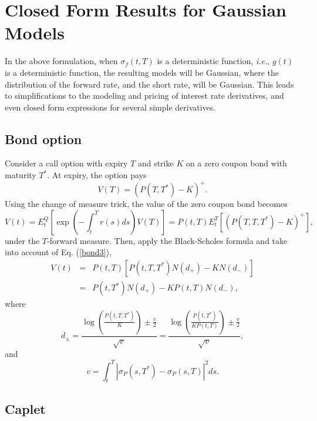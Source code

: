 \documentclass[12pt]{article}
\begin{document}
\section{Closed Form Results for Gaussian Models}

  In the above formulation, when $\sigma_f(t,T)$ is a deterministic function, {\it i.e.}, $g(t)$ is a deterministic function,
  the resulting models will be Gaussian, where the distribution of the forward rate, and the short rate, will be Gaussian.
  This leads to simplifications to the modeling and pricing of interest rate derivatives, and even closed form expressions
  for several simple derivatives.
    
  \subsection{Bond option}
  
    Consider a call option with expiry $T$ and strike $K$ on a zero coupon bond with maturity $T^*$. At expiry, the
    option pays
    \begin{equation}
      V(T)=\left(P(T,T^*)-K\right)^+.
    \end{equation}
    Using the change of measure trick, the value of the zero coupon bond becomes
    \begin{equation}
      V(t)=E_t^Q\left[\exp\left(-\int_t^Tr(s)ds\right)V(T)\right]=P(t,T)E_t^T\left[\left(P(T,T,T^*)-K\right)^+\right],
    \end{equation}
    under the $T$-forward measure. Then, apply the Black-Scholes formula and take into account of Eq. (\ref{bond3}),
    \begin{eqnarray}
      V(t) &=& P(t,T)\left[P(t,T,T^*)N(d_+)-KN(d_-)\right] \nonumber\\
           &=& P(t,T^*)N(d_+) - KP(t,T)N(d_-),
    \end{eqnarray}
    where
    \begin{equation}
      d_{\pm} = \frac{\displaystyle\log\left(\frac{P(t,T,T^*)}{K}\right)\pm \frac{v}{2}}{\sqrt{v}}
             = \frac{\displaystyle\log\left(\frac{P(t,T^*)}{KP(t,T)}\right)\pm \frac{v}{2}}{\sqrt{v}},
    \end{equation}
    and
    \begin{equation}
      v=\int_t^T\left|\sigma_P(s,T^*)-\sigma_P(s,T)\right|^2ds.
    \end{equation}
  
  \subsection{Caplet}
  
\end{document}

